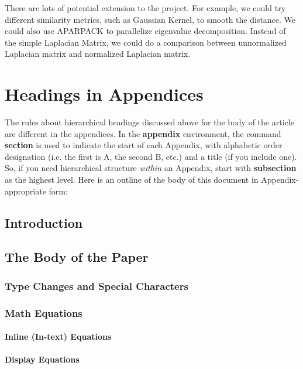 \documentclass{acm_proc_article-sp}
\begin{document}
There are lots of potential extension to the project. For example, we could try different similarity metrics, such as Gaussian Kernel, to smooth the distance. We could also use APARPACK to parallelize eigenvalue decomposition. Instead of the simple Laplacian Matrix, we could do a comparison  between unnormalized Laplacian matrix and normalized Laplacian matrix.

%
%
\appendix
\section{Headings in Appendices}
The rules about hierarchical headings discussed above for
the body of the article are different in the appendices.
In the \textbf{appendix} environment, the command
\textbf{section} is used to
indicate the start of each Appendix, with alphabetic order
designation (i.e. the first is A, the second B, etc.) and
a title (if you include one).  So, if you need
hierarchical structure
\textit{within} an Appendix, start with \textbf{subsection} as the
highest level. Here is an outline of the body of this
document in Appendix-appropriate form:
\subsection{Introduction}
\subsection{The Body of the Paper}
\subsubsection{Type Changes and  Special Characters}
\subsubsection{Math Equations}
\paragraph{Inline (In-text) Equations}
\paragraph{Display Equations}
\end{document}
